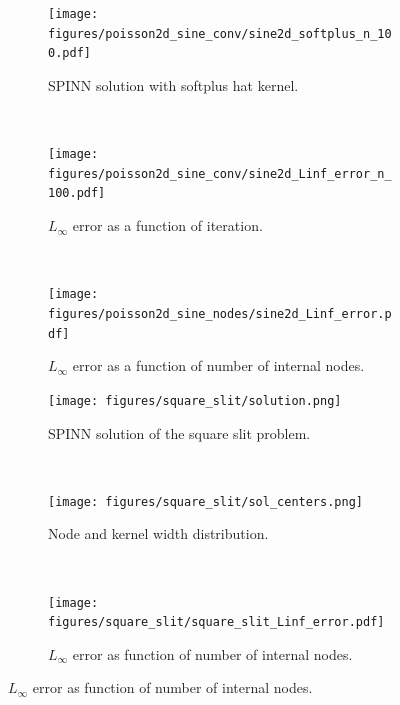 \documentclass[12pt]{article}
\begin{document}
\begin{figure}
\begin{subfigure}{0.32\textwidth}
\centering
\texttt{[image: figures/poisson2d\_sine\_conv/sine2d\_softplus\_n\_100.pdf]}
\caption{SPINN solution with softplus hat kernel.}
\label{fig:2d_A_softplus_n_100}
\end{subfigure}
~
\begin{subfigure}{0.32\textwidth}
\centering
\texttt{[image: figures/poisson2d\_sine\_conv/sine2d\_Linf\_error\_n\_100.pdf]}
\caption{$L_{\infty}$ error as a function of iteration.}
\label{fig:2d_A_Linf_n_100}
\end{subfigure}
~
\begin{subfigure}{0.32\textwidth}
\centering
\texttt{[image: figures/poisson2d\_sine\_nodes/sine2d\_Linf\_error.pdf]}
\caption{$L_{\infty}$ error as a function of number of internal nodes.}
\label{fig:2d_A_Linf}
\end{subfigure}

\begin{subfigure}{0.32\textwidth}
\texttt{[image: figures/square\_slit/solution.png]}
\caption{SPINN solution of the square slit problem.}
\label{fig:poisson_2d_square_slit_sol}
\end{subfigure}
~
\begin{subfigure}{0.32\textwidth}
\texttt{[image: figures/square\_slit/sol\_centers.png]}
\caption{Node and kernel width distribution.}
\label{fig:poisson_2d_square_slit_nodes}
\end{subfigure}
~
\begin{subfigure}{0.32\textwidth}
\texttt{[image: figures/square\_slit/square\_slit\_Linf\_error.pdf]}
\caption{$L_{\infty}$ error as function of number of internal nodes.}
\label{fig:poisson_2d_square_slit_convergence}
\end{subfigure}


\end{figure}
\end{document}
